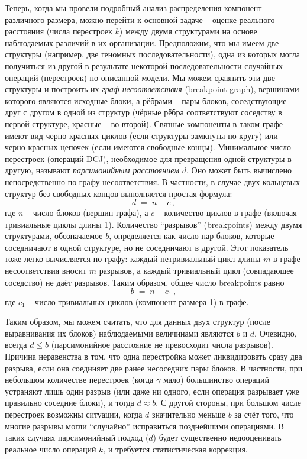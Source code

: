Теперь, когда мы провели подробный анализ распределения компонент различного размера, можно перейти к основной задаче -- оценке реального расстояния (числа перестроек $k$) между двумя структурами на основе наблюдаемых различий в их организации.
Предположим, что мы имеем две структуры (например, две геномных последовательности), одна из которых могла получиться из другой в результате некоторой последовательности случайных операций (перестроек) по описанной модели.
Мы можем сравнить эти две структуры и построить их \emph{граф несоответствия} (breakpoint graph), вершинами которого являются исходные блоки, а рёбрами -- пары блоков, соседствующие друг с другом в одной из структур (чёрные рёбра соответствуют соседству в первой структуре, красные -- во второй).
Связные компоненты в таком графе имеют вид черно-красных циклов (если структуры замкнуты по кругу) или черно-красных цепочек (если имеются свободные концы).
Минимальное число перестроек (операций DCJ), необходимое для превращения одной структуры в другую, называют \emph{парсимонийным расстоянием} $d$. Оно может быть вычислено непосредственно по графу несоответствия.
В частности, в случае двух кольцевых структур без свободных концов выполняется простая формула: 
\[
d \;=\; n - c\,,
\] 
где $n$ -- число блоков (вершин графа), а $c$ -- количество циклов в графе (включая тривиальные циклы длины 1).
Количество ``разрывов'' (breakpoints) между двумя структурами, обозначаемое $b$, определяется как число пар блоков, которые соседничают в одной структуре, но не соседничают в другой. Этот показатель тоже легко вычисляется по графу: каждый нетривиальный цикл длины $m$ в графе несоответствия вносит $m$ разрывов, а каждый тривиальный цикл (совпадающее соседство) не даёт разрывов. Таким образом, общее число breakpoints равно 
\[
b \;=\; n - c_1\,,
\] 
где $c_1$ -- число тривиальных циклов (компонент размера 1) в графе.

Таким образом, мы можем считать, что для данных двух структур (после выравнивания их блоков) наблюдаемыми величинами являются $b$ и $d$. Очевидно, всегда $d \le b$ (парсимонийное расстояние не превосходит числа разрывов). Причина неравенства в том, что одна перестройка может ликвидировать сразу два разрыва, если она соединяет две ранее несоседних пары блоков. В частности, при небольшом количестве перестроек (когда $\gamma$ мало) большинство операций устраняют лишь один разрыв (или даже ни одного, если операция разрывает уже правильно соседние блоки), и тогда $d \approx b$. С другой стороны, при большом числе перестроек возможны ситуации, когда $d$ значительно меньше $b$ за счёт того, что многие разрывы могли ``случайно'' исправиться позднейшими операциями. В таких случаях парсимонийный подход ($d$) будет существенно недооценивать реальное число операций $k$, и требуется статистическая коррекция.

